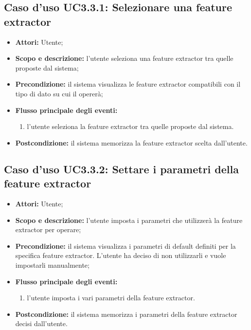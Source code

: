 \subsection{Caso d'uso UC3.3.1: Selezionare una feature extractor}
\begin{itemize}
\item \textbf{Attori:} Utente;
\item \textbf{Scopo e descrizione:} l'utente seleziona una feature extractor\glossario{} tra quelle proposte dal sistema;
\item \textbf{Precondizione:} il sistema visualizza le feature extractor\glossario{} compatibili con il tipo di dato su cui il \protocol{} opererà;
\item \textbf{Flusso principale degli eventi:}
\begin{enumerate}
\item l'utente seleziona la feature extractor\glossario{} tra quelle proposte dal sistema.
\end{enumerate}
\item \textbf{Postcondizione:} il sistema memorizza la feature extractor\glossario{} scelta dall'utente.
\end{itemize}

\subsection{Caso d'uso UC3.3.2: Settare i parametri della feature extractor}
\begin{itemize}
\item \textbf{Attori:} Utente;
\item \textbf{Scopo e descrizione:} l'utente imposta i parametri che utilizzerà la feature extractor\glossario{} per operare;
\item \textbf{Precondizione:} il sistema visualizza i parametri di default definiti per la specifica feature extractor\glossario{}. L'utente ha deciso di non utilizzarli e vuole impostarli manualmente;
\item \textbf{Flusso principale degli eventi:}
\begin{enumerate}
\item l'utente imposta i vari parametri della feature extractor\glossario{}.
\end{enumerate}
\item \textbf{Postcondizione:} il sistema memorizza i parametri della feature extractor\glossario{} decisi dall'utente.
\end{itemize}

